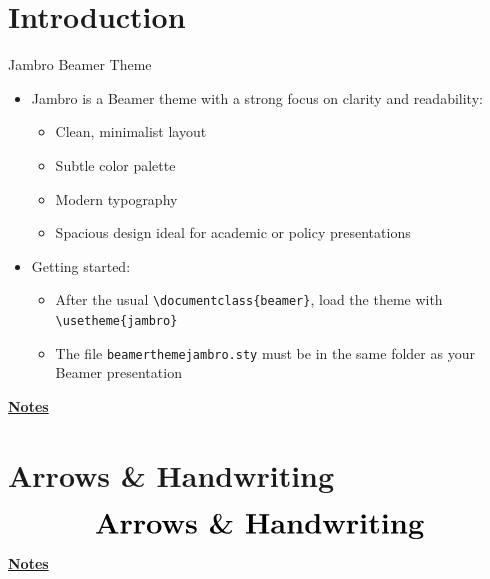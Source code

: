 \documentclass[10pt]{beamer}
\begin{document}
\section{Introduction}
\begin{frame}{Jambro Beamer Theme}
    \small
    \begin{itemize}
        \item Jambro is a Beamer theme with a strong focus on clarity and readability:
        \begin{itemize}
            \item Clean, minimalist layout \smallskip
            \item Subtle color palette \smallskip
            \item Modern typography \smallskip
            \item Spacious design ideal for academic or policy presentations \bigskip
        \end{itemize}
        \item Getting started:
        \begin{itemize}
            \item After the usual \texttt{\textbackslash documentclass\{beamer\}}, load the theme with \texttt{\textbackslash usetheme\{jambro\}} \smallskip
            \item The file \texttt{beamerthemejambro.sty} must be in the same folder as your Beamer presentation
        \end{itemize}
    \end{itemize}
\end{frame}
\begin{flushleft}
	\underline{\textbf{Notes}}\setlength{\parskip}{.15cm}\notesize\newline\par
\end{flushleft}

\section{Arrows \& Handwriting}
\begin{frame}
    \begin{eqnarray*}
        &\text{{\huge \textbf{Arrows \& Handwriting}}}\\
    \end{eqnarray*}
\end{frame}
\begin{flushleft}
    \underline{\textbf{Notes}}\setlength{\parskip}{.15cm}\notesize\newline\par
\end{flushleft}
\end{document}
